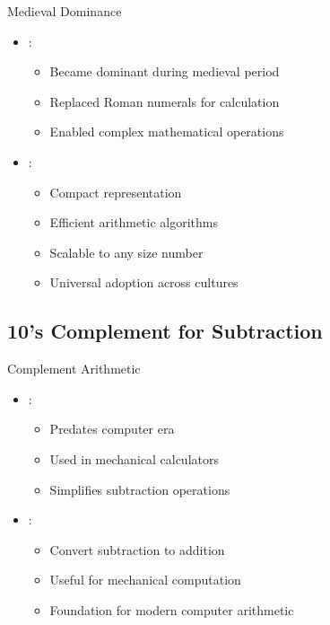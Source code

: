 \begin{frame}{Medieval Dominance}
\begin{itemize}
\item {}:
\begin{itemize}
\item Became dominant during medieval period
\item Replaced Roman numerals for calculation
\item Enabled complex mathematical operations
\end{itemize}
\vspace{0.5cm}
\item {}:
\begin{itemize}
\item Compact representation
\item Efficient arithmetic algorithms
\item Scalable to any size number
\item Universal adoption across cultures
\end{itemize}
\end{itemize}
\end{frame}

\subsection{10's Complement for Subtraction}

\begin{frame}{Complement Arithmetic}
\begin{itemize}
\item {}:
\begin{itemize}
\item Predates computer era
\item Used in mechanical calculators
\item Simplifies subtraction operations
\end{itemize}
\vspace{0.5cm}
\item {}:
\begin{itemize}
\item Convert subtraction to addition
\item Useful for mechanical computation
\item Foundation for modern computer arithmetic
\end{itemize}
\end{itemize}
\end{frame}


